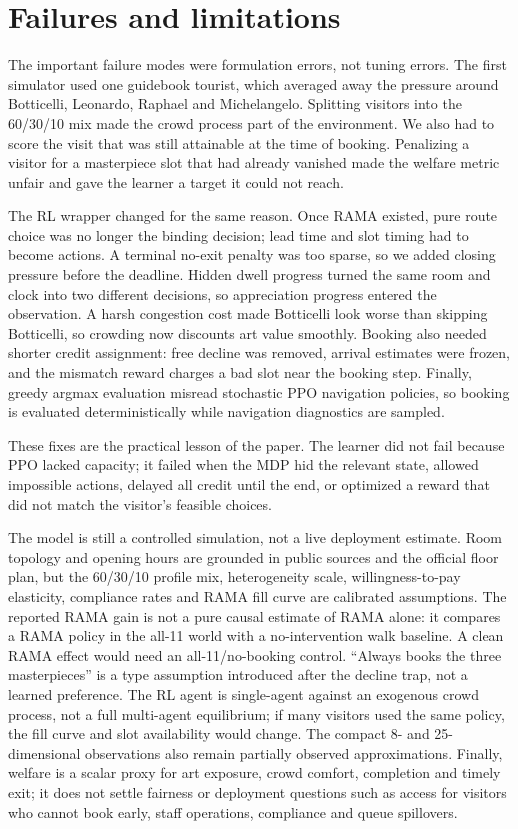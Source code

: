 \documentclass[11pt]{article}
\newenvironment{addedblock}{\begingroup\color{green!50!black}}{\endgroup}
\begin{document}
\begin{addedblock}
\section{Failures and limitations}

The important failure modes were formulation errors, not tuning errors. The first simulator used one
guidebook tourist, which averaged away the pressure around Botticelli, Leonardo, Raphael and
Michelangelo. Splitting visitors into the 60/30/10 mix made the crowd process part of the
environment. We also had to score the visit that was still attainable at the time of booking.
Penalizing a visitor for a masterpiece slot that had already vanished made the welfare metric unfair
and gave the learner a target it could not reach.

The RL wrapper changed for the same reason. Once RAMA existed, pure route choice was no longer the
binding decision; lead time and slot timing had to become actions. A terminal no-exit penalty was too
sparse, so we added closing pressure before the deadline. Hidden dwell progress turned the same room
and clock into two different decisions, so appreciation progress entered the observation. A harsh
congestion cost made Botticelli look worse than skipping Botticelli, so crowding now discounts art
value smoothly. Booking also needed shorter credit assignment: free decline was removed, arrival
estimates were frozen, and the mismatch reward charges a bad slot near the booking step. Finally,
greedy argmax evaluation misread stochastic PPO navigation policies, so booking is evaluated
deterministically while navigation diagnostics are sampled.

These fixes are the practical lesson of the paper. The learner did not fail because PPO lacked
capacity; it failed when the MDP hid the relevant state, allowed impossible actions, delayed all
credit until the end, or optimized a reward that did not match the visitor's feasible choices.

The model is still a controlled simulation, not a live deployment estimate. Room topology and opening
hours are grounded in public sources and the official floor plan, but the 60/30/10 profile mix,
heterogeneity scale, willingness-to-pay elasticity, compliance rates and RAMA fill curve are calibrated
assumptions. The reported RAMA gain is not a pure causal estimate of RAMA alone: it compares a RAMA
policy in the all-11 world with a no-intervention walk baseline. A clean RAMA effect would need an
all-11/no-booking control. ``Always books the three masterpieces'' is a type assumption introduced
after the decline trap, not a learned preference. The RL agent is single-agent against an exogenous
crowd process, not a full multi-agent equilibrium; if many visitors used the same policy, the fill
curve and slot availability would change. The compact 8- and 25-dimensional observations also remain
partially observed approximations. Finally, welfare is a scalar proxy for art exposure, crowd comfort,
completion and timely exit; it does not settle fairness or deployment questions such as access for
visitors who cannot book early, staff operations, compliance and queue spillovers.
\end{addedblock}
\end{document}
